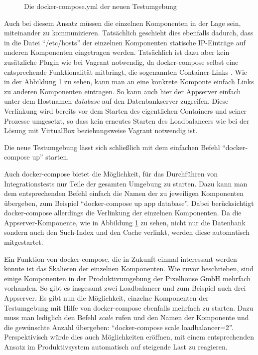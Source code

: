 \begin{figure}[!ht]
  \begin{center}
    \caption{Die docker-compose.yml der neuen Testumgebung}
    \label{dockercomposeyml}
  \end{center}
\end{figure}

Auch bei diesem Ansatz müssen die einzelnen Komponenten in der Lage sein, miteinander zu kommunizieren. Tatsächlich geschieht dies ebenfalls dadurch, dass in die Datei "`/etc/hosts"' der einzelnen Komponenten statische IP-Einträge auf anderen Komponenten eingetragen werden. Tatsächlich ist dazu aber kein zusätzliche Plugin wie bei Vagrant notwendig, da docker-compose selbst eine entsprechende Funktionalität mitbringt, die sogenannten Container-Links \citep[Vgl.][]{dockerlinks}. Wie in der Abbildung \ref{dockercomposeyml} zu sehen, kann man an eine konkrete Komponte einfach Links zu anderen Komponenten eintragen. So kann auch hier der Appserver einfach unter dem Hostnamen \textit{database} auf den Datenbankserver zugreifen. Diese Verlinkung wird bereits vor dem Starten des eigentlichen Containers und seiner Prozesse umgesetzt, so dass kein erneutes Starten des Loadbalancers wie bei der Lösung mit VirtualBox beziehungsweise Vagrant notwendig ist.

Die neue Testumgebung lässt sich schließlich mit dem einfachen Befehl "`docker-compose up"' starten.

Auch docker-compose bietet die Möglichkeit, für das Durchführen von Integrationstests nur Teile der gesamten Umgebung zu starten. Dazu kann man dem entsprechenden Befehl einfach die Namen der zu jeweiligen Komponenten übergeben, zum Beispiel "`docker-compose up app database"'. Dabei berücksichtigt docker-compose allerdings die Verlinkung der einzelnen Komponenten. Da die Appserver-Komponente, wie in Abbildung \ref{dockercomposeyml} zu sehen, nicht nur die Datenbank sondern auch den Such-Index und den Cache verlinkt, werden diese automatisch mitgestartet.

Ein Funktion von docker-compose, die in Zukunft einmal interessant werden könnte ist das Skalieren der einzelnen Komponenten. Wie zuvor beschrieben, sind einige Komponenten in der Produktivumgebung der Pixelhouse GmbH mehrfach vorhanden. So gibt es insgesamt zwei Loadbalancer und zum Beispiel auch drei Appserver. Es gibt nun die Möglichkeit, einzelne Komponenten der Testumgebung mit Hilfe von docker-compose ebenfalls mehrfach zu starten. Dazu muss man lediglich den Befehl \textit{scale} rufen und den Namen der Komponente und die gewünschte Anzahl übergeben: "`docker-compose scale loadbalancer=2"'.
Perspektivisch würde dies auch Möglichkeiten eröffnen, mit einem entsprechenden Ansatz im Produktivsystem automatisch auf steigende Last zu reagieren.